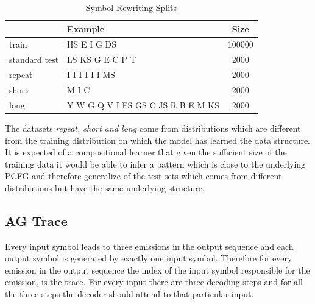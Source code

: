 \begin{table}[ht]
	\centering
	\begin{tabular}{l|lc}
		& Example & Size\\
		\hline
		train & HS E I G DS  & 100000 \\
		standard test & LS KS G E C P T & 2000 \\
		repeat & I I I I I I MS & 2000 \\
		short & M I C & 2000 \\
		long & Y W G Q V I FS GS C JS R B E M KS & 2000 \\
	\end{tabular}
	\caption{Symbol Rewriting Splits}
	\label{sr:stats}
\end{table}

The datasets \textit{repeat, short and long} come from distributions which are different from the training distribution on which the model has learned the data structure. It is expected of a compositional learner that given the sufficient size of the training data it would be able to infer a pattern which is close to the underlying PCFG and therefore generalize of the test sets which comes from different distributions but have the same underlying structure.

\subsection{AG Trace}\label{sr:trace}
Every input symbol leads to three emissions in the output sequence and each output symbol is generated by exactly one input symbol. Therefore for every emission in the output sequence the index of the input symbol responsible for the emission, is the trace. For every input there are three decoding steps and for all the three steps the decoder should attend to that particular input.


